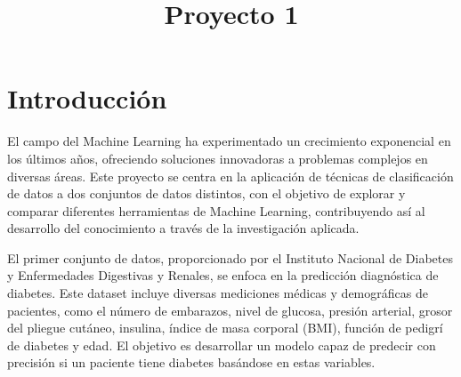 \documentclass[conference]{IEEEtran}
\begin{document}
\title{Proyecto 1\\
}

\author{
\and
{}
}

\maketitle

\begin{abstract}

\end{abstract}

\begin{IEEEkeywords}

\end{IEEEkeywords}

\section{Introducción}

El campo del Machine Learning ha experimentado un crecimiento exponencial en los últimos años, ofreciendo soluciones innovadoras a problemas complejos en diversas áreas. Este proyecto se centra en la aplicación de técnicas de clasificación de datos a dos conjuntos de datos distintos, con el objetivo de explorar y comparar diferentes herramientas de Machine Learning, contribuyendo así al desarrollo del conocimiento a través de la investigación aplicada.

El primer conjunto de datos, proporcionado por el Instituto Nacional de Diabetes y Enfermedades Digestivas y Renales, se enfoca en la predicción diagnóstica de diabetes. Este dataset incluye diversas mediciones médicas y demográficas de pacientes, como el número de embarazos, nivel de glucosa, presión arterial, grosor del pliegue cutáneo, insulina, índice de masa corporal (BMI), función de pedigrí de diabetes y edad. El objetivo es desarrollar un modelo capaz de predecir con precisión si un paciente tiene diabetes basándose en estas variables.
\end{document}
